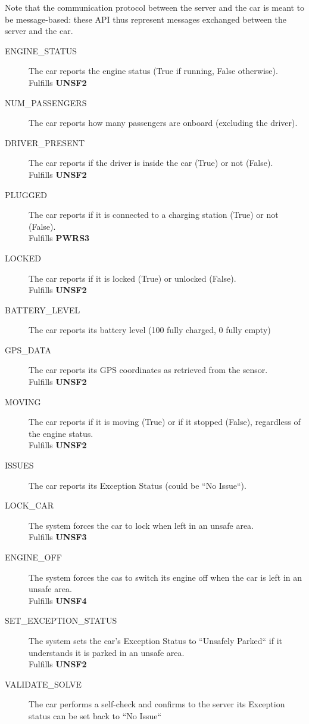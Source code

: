 \documentclass[11pt]{article} %
\begin{document}
Note that the communication protocol between the server and the car is meant to be message-based: these API thus represent messages exchanged between the server and the car.
\begin{description}
	\item[ENGINE\_STATUS] The car reports the engine status (True if running, False otherwise). \\ Fulfills \textbf{UNSF2}
	\item[NUM\_PASSENGERS] The car reports how many passengers are onboard (excluding the driver).
	\item[DRIVER\_PRESENT] The car reports if the driver is inside the car (True) or not (False). \\ Fulfills \textbf{UNSF2}
	\item[PLUGGED] The car reports if it is connected to a charging station (True) or not (False). \\ Fulfills \textbf{PWRS3}
	\item[LOCKED] The car reports if it is locked (True) or unlocked (False). \\ Fulfills \textbf{UNSF2}
	\item[BATTERY\_LEVEL] The car reports its battery level (100 fully charged, 0 fully empty)
	\item[GPS\_DATA] The car reports its GPS coordinates as retrieved from the sensor. \\ Fulfills \textbf{UNSF2}
	\item[MOVING] The car reports if it is moving (True) or if it stopped (False), regardless of the engine status. \\ Fulfills \textbf{UNSF2}
	\item[ISSUES] The car reports its Exception Status (could be ``No Issue``).

	\item[LOCK\_CAR] The system forces the car to lock when left in an unsafe area. \\ Fulfills \textbf{UNSF3}
	\item[ENGINE\_OFF] The system forces the cas to switch its engine off when the car is left in an unsafe area.\\ Fulfills \textbf{UNSF4}
	\item[SET\_EXCEPTION\_STATUS] The system sets the car's Exception Status to ``Unsafely Parked`` if it understands it is parked in an unsafe area. \\ Fulfills \textbf{UNSF2}
	
	\item[VALIDATE\_SOLVE] The car performs a self-check and confirms to the server its Exception status can be set back to ``No Issue``
\end{description}
\end{document}
